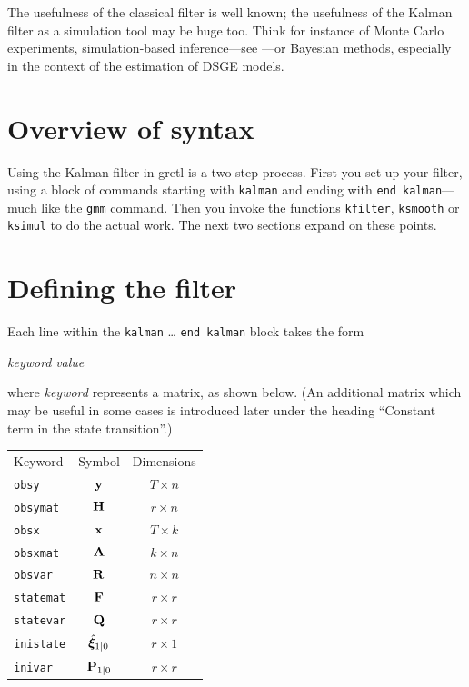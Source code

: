The usefulness of the classical filter is well known; the usefulness
of the Kalman filter as a simulation tool may be huge too. Think for
instance of Monte Carlo experiments, simulation-based inference---see
\cite{gourieroux96}---or Bayesian methods, especially in the
context of the estimation of DSGE models.

\section{Overview of syntax}

Using the Kalman filter in gretl is a two-step process.  First you set
up your filter, using a block of commands starting with
\texttt{kalman} and ending with \texttt{end kalman}---much like the
\texttt{gmm} command.  Then you invoke the functions \texttt{kfilter},
\texttt{ksmooth} or \texttt{ksimul} to do the actual work.  The next
two sections expand on these points.

\section{Defining the filter}

Each line within the \texttt{kalman} \dots{} \texttt{end kalman} block 
takes the form

\vspace{1ex}
\textsl{keyword} \textsl{value}
\vspace{1ex}

\noindent where \textsl{keyword} represents a matrix, as shown 
below. (An additional matrix which may be useful in some cases
is introduced later under the heading ``Constant term in the
state transition''.)

\begin{center}
\begin{tabular}{lcc}
Keyword & Symbol & Dimensions \\[6pt]
\texttt{obsy}     & $\mathbf{y}$         & $T \times n$ \\
\texttt{obsymat}  & $\mathbf{H}$         & $r \times n$ \\
\texttt{obsx}     & $\mathbf{x}$           & $T \times k$ \\
\texttt{obsxmat}  & $\mathbf{A}$        & $k \times n$ \\ 
\texttt{obsvar}   & $\mathbf{R}$         & $n \times n$ \\
\texttt{statemat} & $\mathbf{F}$       & $r \times r$ \\
\texttt{statevar} & $\mathbf{Q}$         & $r \times r$ \\
\texttt{inistate} & $\hat{\bm{\xi}}_{1|0}$  & $r \times 1$ \\
\texttt{inivar}   & $\mathbf{P}_{1|0}$ & $r \times r$ \\
\end{tabular}
\end{center}

